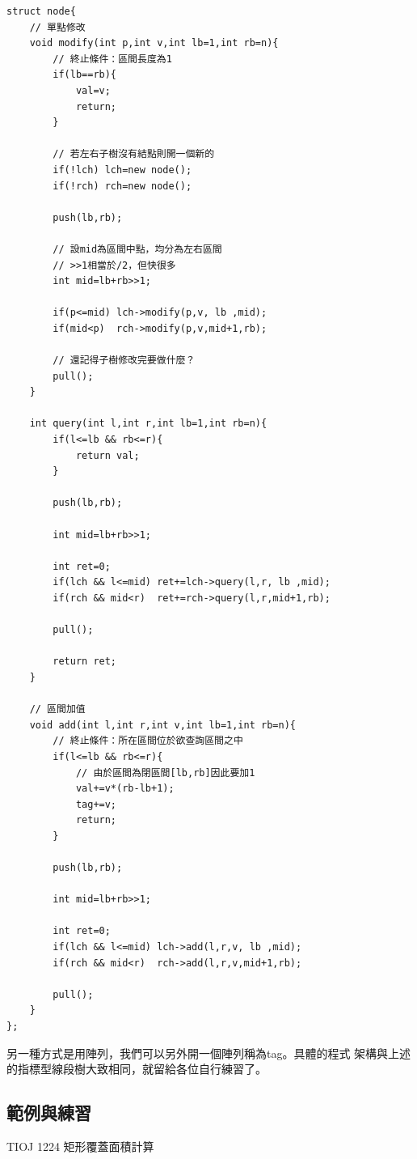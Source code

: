 \begin{lstlisting}[caption=懶人標記的node]
struct node{
    // 單點修改
    void modify(int p,int v,int lb=1,int rb=n){
        // 終止條件：區間長度為1
        if(lb==rb){
            val=v;
            return;
        }

        // 若左右子樹沒有結點則開一個新的
        if(!lch) lch=new node();
        if(!rch) rch=new node();

        push(lb,rb);
        
        // 設mid為區間中點，均分為左右區間
        // >>1相當於/2，但快很多
        int mid=lb+rb>>1;

        if(p<=mid) lch->modify(p,v, lb ,mid);
        if(mid<p)  rch->modify(p,v,mid+1,rb);

        // 還記得子樹修改完要做什麼？
        pull();
    }

    int query(int l,int r,int lb=1,int rb=n){
        if(l<=lb && rb<=r){
            return val;
        }

        push(lb,rb);
        
        int mid=lb+rb>>1;

        int ret=0;
        if(lch && l<=mid) ret+=lch->query(l,r, lb ,mid);
        if(rch && mid<r)  ret+=rch->query(l,r,mid+1,rb);

        pull();

        return ret;
    }
    
    // 區間加值
    void add(int l,int r,int v,int lb=1,int rb=n){
        // 終止條件：所在區間位於欲查詢區間之中
        if(l<=lb && rb<=r){
            // 由於區間為閉區間[lb,rb]因此要加1
            val+=v*(rb-lb+1);
            tag+=v;
            return;
        }

        push(lb,rb);
        
        int mid=lb+rb>>1;

        int ret=0;
        if(lch && l<=mid) lch->add(l,r,v, lb ,mid);
        if(rch && mid<r)  rch->add(l,r,v,mid+1,rb);

        pull();
    }
};
\end{lstlisting}

    另一種方式是用陣列，我們可以另外開一個陣列稱為tag。具體的程式
    架構與上述的指標型線段樹大致相同，就留給各位自行練習了。

    \subsection{範例與練習}
    \example TIOJ 1224 矩形覆蓋面積計算


